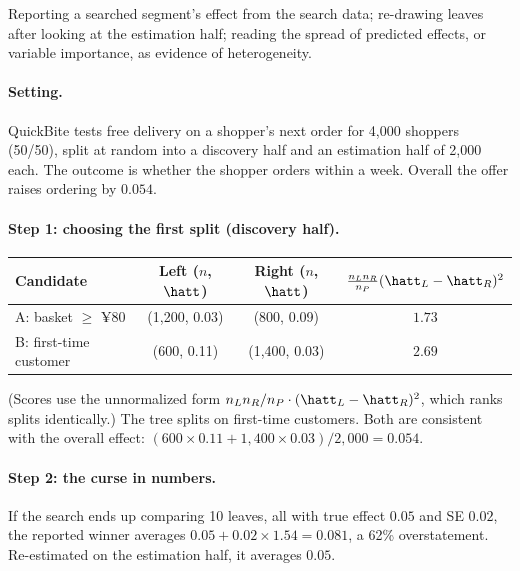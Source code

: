 \documentclass[11pt]{article}
\begin{document}
\begin{pitfall}
Reporting a searched segment's effect from the search data; re-drawing leaves after looking at the estimation
half; reading the spread of predicted effects, or variable importance, as evidence of heterogeneity.
\end{pitfall}


\sectiontwo

\paragraph{Setting.} QuickBite tests free delivery on a shopper's next order for 4{,}000 shoppers (50/50), split at random into a discovery half and an estimation half of 2{,}000 each. The
outcome is whether the shopper orders within a week. Overall the offer raises ordering by $0.054$.

\paragraph{Step 1: choosing the first split (discovery half).}
\begin{center}
\begin{tabular}{lccc}
\toprule
Candidate & Left ($n$, $\hatt$) & Right ($n$, $\hatt$) & $\tfrac{n_Ln_R}{n_P}(\hatt_L - \hatt_R)^2$ \\
\midrule
A: basket $\ge$ ¥80 & (1{,}200, 0.03) & (800, 0.09) & $1.73$ \\
B: first-time customer & (600, 0.11) & (1{,}400, 0.03) & $2.69$ \\
\bottomrule
\end{tabular}
\end{center}
(Scores use the unnormalized form $n_Ln_R/n_P \cdot (\hatt_L - \hatt_R)^2$, which ranks splits identically.) The tree
splits on first-time customers. Both are consistent with the overall effect: $(600 \times 0.11 + 1{,}400 \times 0.03)/2{,}000 = 0.054$.

\paragraph{Step 2: the curse in numbers.} If the search ends up comparing 10 leaves, all with true effect $0.05$
and SE $0.02$, the reported winner averages $0.05 + 0.02 \times 1.54 = 0.081$, a 62\% overstatement. Re-estimated on
the estimation half, it averages $0.05$.
\end{document}
